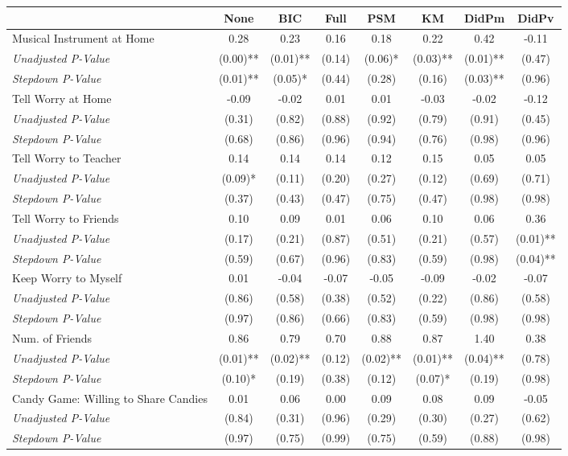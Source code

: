 \begin{tabular}{l c c c c c c c}
\toprule
 & None & BIC & Full & PSM & KM & DidPm & DidPv \\
\midrule
Musical Instrument at Home & 0.28 & 0.23 & 0.16 & 0.18 & 0.22 & 0.42 & -0.11 \\
\quad \textit{Unadjusted P-Value} & (0.00)** & (0.01)** & (0.14) & (0.06)* & (0.03)** & (0.01)** & (0.47) \\
\quad \textit{Stepdown P-Value} & (0.01)** & (0.05)* & (0.44) & (0.28) & (0.16) & (0.03)** & (0.96) \\
Tell Worry at Home & -0.09 & -0.02 & 0.01 & 0.01 & -0.03 & -0.02 & -0.12 \\
\quad \textit{Unadjusted P-Value} & (0.31) & (0.82) & (0.88) & (0.92) & (0.79) & (0.91) & (0.45) \\
\quad \textit{Stepdown P-Value} & (0.68) & (0.86) & (0.96) & (0.94) & (0.76) & (0.98) & (0.96) \\
Tell Worry to Teacher & 0.14 & 0.14 & 0.14 & 0.12 & 0.15 & 0.05 & 0.05 \\
\quad \textit{Unadjusted P-Value} & (0.09)* & (0.11) & (0.20) & (0.27) & (0.12) & (0.69) & (0.71) \\
\quad \textit{Stepdown P-Value} & (0.37) & (0.43) & (0.47) & (0.75) & (0.47) & (0.98) & (0.98) \\
Tell Worry to Friends & 0.10 & 0.09 & 0.01 & 0.06 & 0.10 & 0.06 & 0.36 \\
\quad \textit{Unadjusted P-Value} & (0.17) & (0.21) & (0.87) & (0.51) & (0.21) & (0.57) & (0.01)** \\
\quad \textit{Stepdown P-Value} & (0.59) & (0.67) & (0.96) & (0.83) & (0.59) & (0.98) & (0.04)** \\
Keep Worry to Myself & 0.01 & -0.04 & -0.07 & -0.05 & -0.09 & -0.02 & -0.07 \\
\quad \textit{Unadjusted P-Value} & (0.86) & (0.58) & (0.38) & (0.52) & (0.22) & (0.86) & (0.58) \\
\quad \textit{Stepdown P-Value} & (0.97) & (0.86) & (0.66) & (0.83) & (0.59) & (0.98) & (0.98) \\
Num. of Friends & 0.86 & 0.79 & 0.70 & 0.88 & 0.87 & 1.40 & 0.38 \\
\quad \textit{Unadjusted P-Value} & (0.01)** & (0.02)** & (0.12) & (0.02)** & (0.01)** & (0.04)** & (0.78) \\
\quad \textit{Stepdown P-Value} & (0.10)* & (0.19) & (0.38) & (0.12) & (0.07)* & (0.19) & (0.98) \\
Candy Game: Willing to Share Candies & 0.01 & 0.06 & 0.00 & 0.09 & 0.08 & 0.09 & -0.05 \\
\quad \textit{Unadjusted P-Value} & (0.84) & (0.31) & (0.96) & (0.29) & (0.30) & (0.27) & (0.62) \\
\quad \textit{Stepdown P-Value} & (0.97) & (0.75) & (0.99) & (0.75) & (0.59) & (0.88) & (0.98) \\
\bottomrule
\end{tabular}
